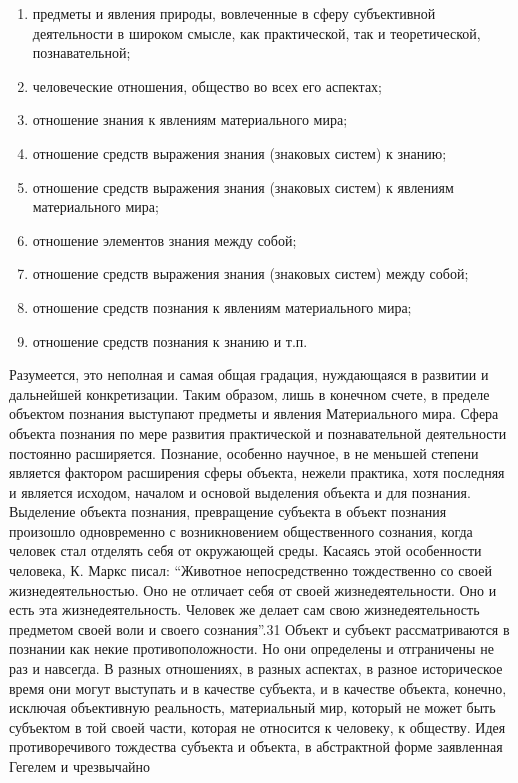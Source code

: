 \documentclass[12pt]{article}
\begin{document}
\begin{enumerate}
  \item предметы и явления природы, вовлеченные в
сферу субъективной деятельности в широком смысле, как практической, так и теоретической, познавательной;
\item человеческие отношения, общество во всех его аспектах;
\item отношение знания к явлениям материального
мира;
\item отношение средств выражения знания (знаковых систем) к знанию;
\item отношение средств выражения
знания (знаковых систем) к явлениям материального мира;
\item отношение элементов знания между собой;
\item
отношение  средств  выражения  знания  (знаковых  систем)  между  собой; 
\item отношение  средств  познания  к
явлениям материального мира;
\item отношение средств познания к знанию и т.п.
\end{enumerate}
  Разумеется, это неполная и самая
общая градация, нуждающаяся в развитии и дальнейшей конкретизации. Таким образом, лишь в конечном
счете, в пределе объектом познания выступают предметы и явления Материального мира.
Сфера  объекта  познания  по  мере  развития  практической  и  познавательной  деятельности  постоянно
расширяется.  Познание,  особенно  научное,  в  не  меньшей  степени  является  фактором  расширения  сферы
объекта, нежели практика, хотя последняя и является исходом, началом и основой выделения объекта и для
познания. Выделение объекта познания, превращение субъекта в объект познания произошло одновременно с
возникновением общественного сознания, когда человек стал отделять себя от окружающей среды. Касаясь этой
особенности  человека,  К.  Маркс  писал:  “Животное  непосредственно  тождественно  со  своей
жизнедеятельностью. Оно не отличает себя от своей жизнедеятельности. Оно и есть эта жизнедеятельность.
Человек же делает сам свою жизнедеятельность предметом своей воли и своего сознания”.31
Объект  и  субъект  рассматриваются  в  познании  как  некие  противоположности.  Но  они  определены  и
отграничены не раз и навсегда. В разных отношениях, в разных аспектах, в разное историческое время они
могут выступать и в качестве субъекта, и в качестве объекта, конечно, исключая объективную реальность,
материальный мир, который не может быть субъектом в той своей части, которая не относится к человеку, к
обществу.
Идея противоречивого тождества субъекта и объекта, в абстрактной форме заявленная Гегелем и чрезвычайно
\end{document}
